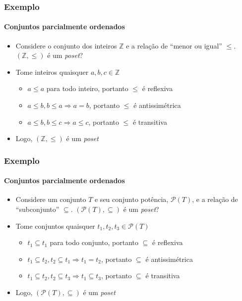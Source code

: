 \documentclass[12pt]{beamer}
\begin{document}
\begin{frame}
  \frametitle{Exemplo}
  \framesubtitle{Conjuntos parcialmente ordenados}
  \begin{itemize}
    \item<1-> Considere o conjunto dos inteiros $\mathbb{Z}$ e a relação de
        ``menor ou igual'' $\leq$. $(\mathbb{Z}, \leq)$ é um \emph{poset}?
    \item<2-> Tome inteiros quaisquer $a, b, c \in \mathbb{Z}$
    \begin{itemize}[itemsep=0pt]
      \item<3-> $a \leq a$ para todo inteiro, portanto $\leq$ é reflexiva
      \item<4-> $a \leq b, b \leq a \Rightarrow a = b$, portanto $\leq$ é
          antissimétrica
      \item<5-> $a \leq b, b \leq c \Rightarrow a \leq c$, portanto $\leq$ é
          transitiva
    \end{itemize}
    \item<6-> Logo, $(\mathbb{Z}, \leq)$ é um \emph{poset}
  \end{itemize}
\end{frame}

\begin{frame}
  \frametitle{Exemplo}
  \framesubtitle{Conjuntos parcialmente ordenados}
  \begin{itemize}
    \item<1-> Considere um conjunto $T$ e seu conjunto potência,
        $\mathcal{P}(T)$, e a relação de ``subconjunto'' $\subseteq$.
          $(\mathcal{P}(T), \subseteq)$ é um \emph{poset}?
    \item<2-> Tome conjuntos quaisquer $t_1, t_2, t_3 \in \mathcal{P}(T)$
    \begin{itemize}[itemsep=0pt]
      \item<3-> $t_1 \subseteq t_1$ para todo conjunto, portanto $\subseteq$ é
          reflexiva
      \item<4-> $t_1 \subseteq t_2, t_2 \subseteq t_1 \Rightarrow t_1 = t_2$,
          portanto $\subseteq$ é antissimétrica
      \item<5-> $t_1 \subseteq t_2, t_2 \subseteq t_3 \Rightarrow t_1 \subseteq
          t_3$, portanto $\subseteq$ é transitiva
    \end{itemize}
    \item<6-> Logo, $(\mathcal{P}(T), \subseteq)$ é um \emph{poset}
  \end{itemize}
\end{frame}
\end{document}
